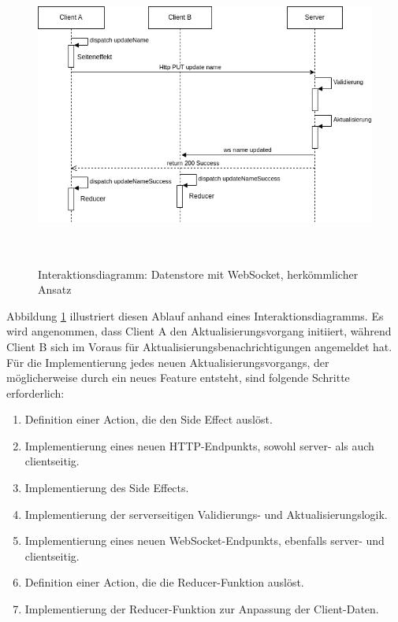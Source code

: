 \documentclass[12pt]{book}          %
\begin{document}
\begin{figure}[htbp]
\centering
\includegraphics[height=10cm]{abbildungen/store-and-socket-herkoemmlich.png}
\caption{Interaktionsdiagramm: Datenstore mit WebSocket, herkömmlicher Ansatz}
\label{store-and-socket-herkoemmlich}
\end{figure}

Abbildung \ref{store-and-socket-herkoemmlich} illustriert diesen Ablauf anhand eines Interaktionsdiagramms. Es wird angenommen, dass Client A den Aktualisierungsvorgang initiiert, während Client B sich im Voraus für Aktualisierungsbenachrichtigungen angemeldet hat. Für die Implementierung jedes neuen Aktualisierungsvorgangs, der möglicherweise durch ein neues Feature entsteht, sind folgende Schritte erforderlich:

\begin{enumerate}
    \item Definition einer Action, die den Side Effect auslöst.
    \item Implementierung eines neuen HTTP-Endpunkts, sowohl server- als auch clientseitig.
    \item Implementierung des Side Effects.
    \item Implementierung der serverseitigen Validierungs- und Aktualisierungslogik.
    \item Implementierung eines neuen WebSocket-Endpunkts, ebenfalls server- und clientseitig.
    \item Definition einer Action, die die Reducer-Funktion auslöst.
    \item Implementierung der Reducer-Funktion zur Anpassung der Client-Daten.
\end{enumerate}
\end{document}
